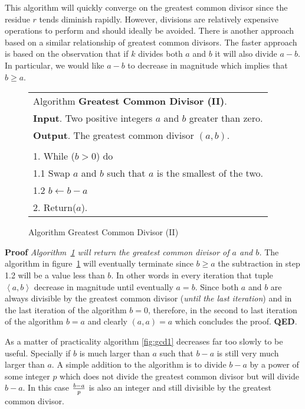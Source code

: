 \documentclass[b5paper]{book}
\begin{document}
This algorithm will quickly converge on the greatest common divisor since the residue $r$ tends diminish rapidly.  However, divisions are
relatively expensive operations to perform and should ideally be avoided.  There is another approach based on a similar relationship of 
greatest common divisors.  The faster approach is based on the observation that if $k$ divides both $a$ and $b$ it will also divide $a - b$.  
In particular, we would like $a - b$ to decrease in magnitude which implies that $b \ge a$.  

\begin{figure}[!here]
\begin{small}
\begin{center}
\begin{tabular}{l}
\hline Algorithm \textbf{Greatest Common Divisor (II)}. \\
\textbf{Input}.   Two positive integers $a$ and $b$ greater than zero. \\
\textbf{Output}.  The greatest common divisor $(a, b)$.  \\
\hline \\
1.  While ($b > 0$) do \\
\hspace{3mm}1.1  Swap $a$ and $b$ such that $a$ is the smallest of the two. \\
\hspace{3mm}1.2  $b \leftarrow b - a$ \\
2.  Return($a$). \\
\hline
\end{tabular}
\end{center}
\end{small}
\caption{Algorithm Greatest Common Divisor (II)}
\label{fig:gcd2}
\end{figure}

\textbf{Proof} \textit{Algorithm~\ref{fig:gcd2} will return the greatest common divisor of $a$ and $b$.}
The algorithm in figure~\ref{fig:gcd2} will eventually terminate since $b \ge a$ the subtraction in step 1.2 will be a value less than $b$.  In other
words in every iteration that tuple $\left < a, b \right >$ decrease in magnitude until eventually $a = b$.  Since both $a$ and $b$ are always 
divisible by the greatest common divisor (\textit{until the last iteration}) and in the last iteration of the algorithm $b = 0$, therefore, in the 
second to last iteration of the algorithm $b = a$ and clearly $(a, a) = a$ which concludes the proof.  \textbf{QED}.

As a matter of practicality algorithm \ref{fig:gcd1} decreases far too slowly to be useful.  Specially if $b$ is much larger than $a$ such that 
$b - a$ is still very much larger than $a$.  A simple addition to the algorithm is to divide $b - a$ by a power of some integer $p$ which does
not divide the greatest common divisor but will divide $b - a$.  In this case ${b - a} \over p$ is also an integer and still divisible by
the greatest common divisor.
\end{document}
